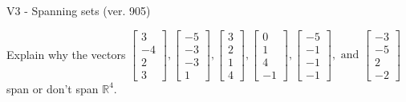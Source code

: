 \begin{exercise}
  \begin{exerciseTitle}V3 - Spanning sets (ver. 905)\end{exerciseTitle}
  \begin{exerciseStatement}
    Explain why the vectors \(\left[\begin{array}{r}
3 \\
-4 \\
2 \\
3
\end{array}\right] , \left[\begin{array}{r}
-5 \\
-3 \\
-3 \\
1
\end{array}\right] , \left[\begin{array}{r}
3 \\
2 \\
1 \\
4
\end{array}\right] , \left[\begin{array}{r}
0 \\
1 \\
4 \\
-1
\end{array}\right] , \left[\begin{array}{r}
-5 \\
-1 \\
-1 \\
-1
\end{array}\right] , \text{ and } \left[\begin{array}{r}
-3 \\
-5 \\
2 \\
-2
\end{array}\right]\) span or don't span \(\mathbb{R}^4\). 
	



\end{exerciseStatement}
\end{exercise}

